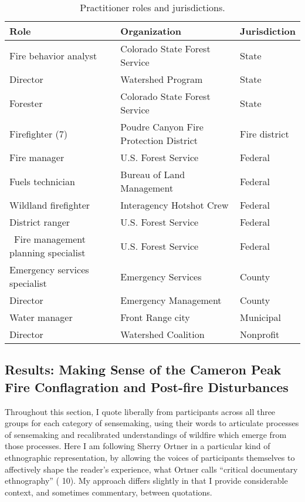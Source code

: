 \documentclass[
]{article}
\begin{document}
\captionsetup{width=6.5in}

\begin{table}[!h]
\centering\centering
\caption{\label{tab:ch4Tbl2}Practitioner roles and jurisdictions.}
\centering
\begin{tabu} to 
\toprule
Role & Organization & Jurisdiction\\
\midrule
Fire behavior analyst & Colorado State Forest Service & State\\
Director & Watershed Program & State\\
Forester & Colorado State Forest Service & State\\
Firefighter (7) & Poudre Canyon Fire Protection District & Fire district\\
Fire manager & U.S. Forest Service & Federal\\
\addlinespace
Fuels technician & Bureau of Land Management & Federal\\
Wildland firefighter & Interagency Hotshot Crew & Federal\\
District ranger & U.S. Forest Service & Federal\\
 Fire management planning specialist & U.S. Forest Service & Federal\\
Emergency services specialist & Emergency Services & County\\
\addlinespace
Director & Emergency Management & County\\
Water manager & Front Range city & Municipal\\
Director & Watershed Coalition & Nonprofit\\
\bottomrule
\end{tabu}
\end{table}

\subsection{Results: Making Sense of the Cameron Peak Fire Conflagration and Post-fire Disturbances}\label{results-making-sense-of-the-cameron-peak-fire-conflagration-and-post-fire-disturbances}

Throughout this section, I quote liberally from participants across all three groups for each category of sensemaking, using their words to articulate processes of sensemaking and recalibrated understandings of wildfire which emerge from those processes. Here I am following Sherry Ortner in a particular kind of ethnographic representation, by allowing the voices of participants themselves to affectively shape the reader's experience, what Ortner calls ``critical documentary ethnography'' ( 10). My approach differs slightly in that I provide considerable context, and sometimes commentary, between quotations.
\end{document}
